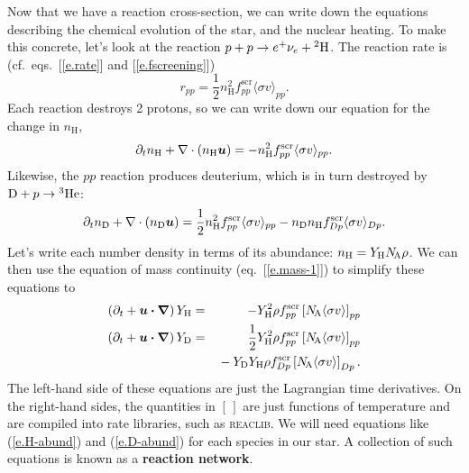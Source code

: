 Now that we have a reaction cross-section, we can write down the equations describing the chemical evolution of the star, and the nuclear heating. To make this concrete, let's look at the reaction $\pt + \pt \to e^{+}\nu_{e} + \hydrogen[2]$. The reaction rate is (cf.\ eqs.~[\ref{e.rate}] and [\ref{e.fscreening}])
\[ r_{pp} = \frac{1}{2} n_{\mathrm{H}}^{2}f^{\mathrm{scr}}_{pp}\langle\sigma v\rangle_{pp}. \]
Each reaction destroys 2 protons, so we can write down our equation for the change in $n_{\mathrm{H}}$,
\begin{equation}\label{e.H-conservation-1}
\partial_{t} n_{\mathrm{H}} + \divr(n_{\mathrm{H}}\vu) = -n_{\mathrm{H}}^{2} f^{\mathrm{scr}}_{pp} \langle\sigma v\rangle_{pp}.
\end{equation}
Likewise, the $pp$ reaction produces deuterium, which is in turn destroyed by $\mathrm{D} + \pt \to \helium[3]$:
\begin{equation}\label{e.H-conservation-2}
\partial_{t} n_{\mathrm{D}} + \divr(n_{\mathrm{D}}\vu) = \frac{1}{2} n_{\mathrm{H}}^{2} f^{\mathrm{scr}}_{pp}\langle\sigma v\rangle_{pp} - n_{\mathrm{D}} n_{\mathrm{H}} f^{\mathrm{scr}}_{Dp}\langle\sigma v\rangle_{Dp}.
\end{equation}
Let's write each number density in terms of its abundance: $n_{\mathrm{H}} = Y_{\mathrm{H}}\NA\rho$. We can then use the equation of mass continuity (eq.~[\ref{e.mass-1}]) to simplify these equations to
\begin{eqnarray}
\left(\partial_{t} + \vu\vdot\grad\right) Y_{\mathrm{H}}  &=& -Y_{\mathrm{H}}^{2}\rho f^{\mathrm{scr}}_{pp} \left[\NA\langle\sigma v\rangle\right]_{pp}\label{e.H-abund} \\
\left(\partial_{t}  + \vu\vdot\grad\right) Y_{\mathrm{D}} &=& \frac{1}{2} Y_{\mathrm{H}}^{2}\rho f^{\mathrm{scr}}_{pp} \left[\NA\langle\sigma v\rangle\right]_{pp} \nonumber\\ && {}- Y_{\mathrm{D}} Y_{\mathrm{H}} \rho f^{\mathrm{scr}}_{Dp}\left[\NA \langle\sigma v\rangle\right]_{Dp}. \label{e.D-abund}
\end{eqnarray}
The left-hand side of these equations are just the Lagrangian time derivatives. On the right-hand sides, the quantities in $[\,]$ are just functions of temperature and are compiled into rate libraries, such as \textsc{reaclib}.
We will need equations like (\ref{e.H-abund}) and (\ref{e.D-abund}) for each species in our star. A collection of such equations is known as a \textbf{reaction network}.

